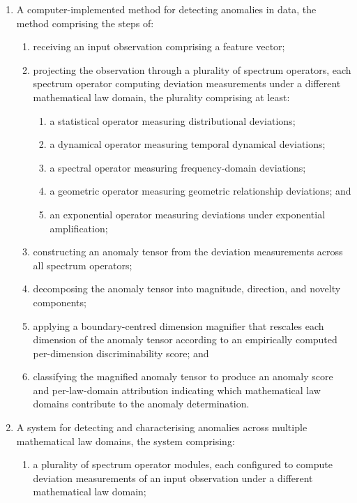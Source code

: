 \documentclass[12pt,a4paper]{article}
\begin{document}
\begin{enumerate}[label=\textbf{\arabic*.}]

\item A computer-implemented method for detecting anomalies in data, the 
method comprising the steps of:
\begin{enumerate}[label=(\alph*)]
\item receiving an input observation comprising a feature vector;

\item projecting the observation through a plurality of spectrum operators, 
each spectrum operator computing deviation measurements under a different 
mathematical law domain, the plurality comprising at least:
\begin{enumerate}[label=(\roman*)]
\item a statistical operator measuring distributional deviations;
\item a dynamical operator measuring temporal dynamical deviations;
\item a spectral operator measuring frequency-domain deviations;
\item a geometric operator measuring geometric relationship deviations; and
\item an exponential operator measuring deviations under exponential 
amplification;
\end{enumerate}

\item constructing an anomaly tensor from the deviation measurements across 
all spectrum operators;

\item decomposing the anomaly tensor into magnitude, direction, and novelty 
components;

\item applying a boundary-centred dimension magnifier that rescales each 
dimension of the anomaly tensor according to an empirically computed 
per-dimension discriminability score; and

\item classifying the magnified anomaly tensor to produce an anomaly score 
and per-law-domain attribution indicating which mathematical law domains 
contribute to the anomaly determination.
\end{enumerate}

\item A system for detecting and characterising anomalies across multiple 
mathematical law domains, the system comprising:
\begin{enumerate}[label=(\alph*)]
\item a plurality of spectrum operator modules, each configured to compute 
deviation measurements of an input observation under a different mathematical 
law domain;


\end{enumerate}
\end{enumerate}
\end{document}
